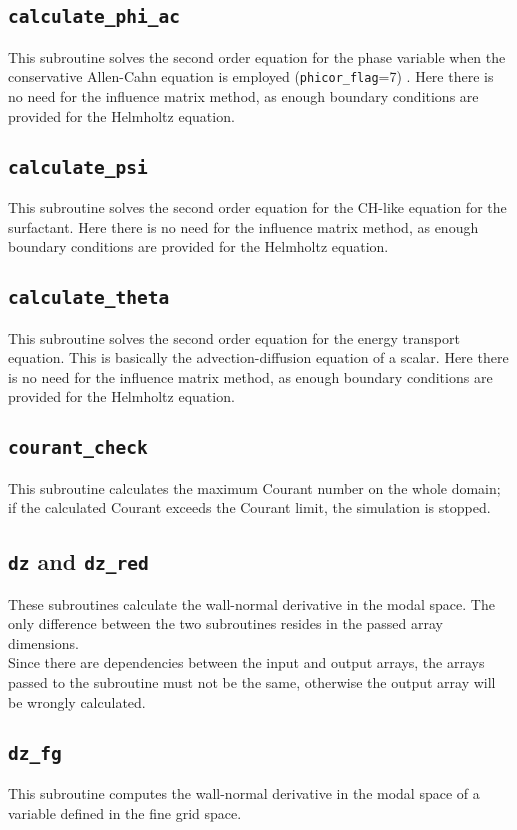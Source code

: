 \subsection{\texttt{calculate\_phi\_ac}}
This subroutine solves the second order equation for the phase variable when the conservative Allen-Cahn equation is employed (\texttt{phicor\_flag}=7) . 
Here there is no need for the influence matrix method, as enough boundary conditions are provided for the Helmholtz equation.

\subsection{\texttt{calculate\_psi}}
This subroutine solves the second order equation for the CH-like equation for the surfactant.
Here there is no need for the influence matrix method, as enough boundary conditions are provided for the Helmholtz equation.

\subsection{\texttt{calculate\_theta}}
This subroutine solves the second order equation for the energy transport equation.
This is basically the advection-diffusion equation of a scalar. 
Here there is no need for the influence matrix method, as enough boundary conditions are provided for the Helmholtz equation.

\subsection{\texttt{courant\_check}}
This subroutine calculates the maximum Courant number on the whole domain; if the calculated Courant exceeds the Courant limit, the simulation is stopped.

\subsection{\texttt{dz} and \texttt{dz\_red}}
These subroutines calculate the wall-normal derivative in the modal space. The only difference between the two subroutines resides in the passed array dimensions.\\
Since there are dependencies between the input and output arrays, the arrays passed to the subroutine must not be the same, otherwise the output array will be wrongly calculated.

\subsection{\texttt{dz\_fg}}
This subroutine computes the wall-normal derivative in the modal space of a variable defined in the fine grid space. 

